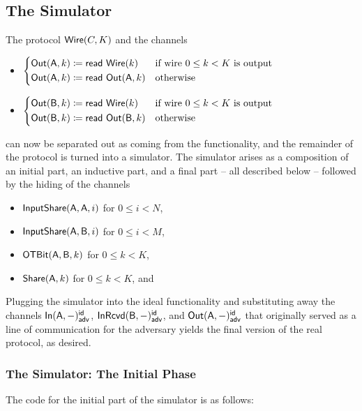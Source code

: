\subsection{The Simulator}
The protocol $\mathsf{Wire}(C,K)$ and the channels
\begin{itemize}
\item $\begin{cases*} \Out(\A,k) \coloneqq \read{\Wire(k)} & \text{if wire $0 \leq k < K$ is output} \\ \Out(\A,k) \coloneqq \read{\Out(\A,k)} & \text{otherwise} \end{cases*}$
\item $\begin{cases*} \Out(\B,k) \coloneqq \read{\Wire(k)} & \text{if wire $0 \leq k < K$ is output} \\ \Out(\B,k) \coloneqq \read{\Out(\B,k)} & \text{otherwise} \end{cases*}$
\end{itemize}
can now be separated out as coming from the functionality, and the remainder of the protocol is turned into a simulator. The simulator arises as a composition of an initial part, an inductive part, and a final part -- all described below -- followed by the hiding of the channels \smallskip
\begin{itemize}
\item $\mathsf{InputShare}(\mathsf{A},\mathsf{A},i)$ for $0 \leq i < N$,
\item $\mathsf{InputShare}(\mathsf{A},\mathsf{B},i)$ for $0 \leq i < M$,
\item $\mathsf{OTBit}(\mathsf{A},\mathsf{B},k)$ for $0 \leq k < K$,
\item $\mathsf{Share}(\mathsf{A},k)$ for $0 \leq k < K$, and
\end{itemize}\smallskip
Plugging the simulator into the ideal functionality and substituting away the channels $\mathsf{In}(\mathsf{A},-)^{\mathsf{id}}_{\mathsf{adv}}$, $\mathsf{InRcvd}(\mathsf{B},-)^{\mathsf{id}}_{\mathsf{adv}}$, and $\mathsf{Out}(\mathsf{A},-)^{\mathsf{id}}_{\mathsf{adv}}$ that originally served as a line of communication for the adversary yields the final version of the real protocol, as desired.

\subsubsection{The Simulator: The Initial Phase}
The code for the initial part of the simulator is as follows:


